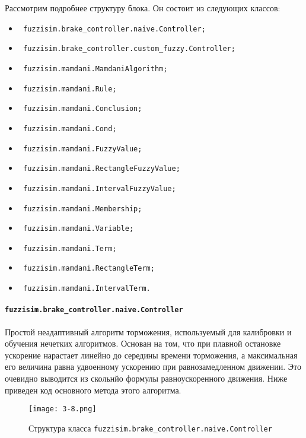 Рассмотрим подробнее структуру блока. Он состоит из следующих классов:

\begin{itemize}
	\item \lstinline! fuzzisim.brake_controller.naive.Controller;!
	\item \lstinline! fuzzisim.brake_controller.custom_fuzzy.Controller;!
	\item \lstinline! fuzzisim.mamdani.MamdaniAlgorithm;!
	\item \lstinline! fuzzisim.mamdani.Rule;!
	\item \lstinline! fuzzisim.mamdani.Conclusion;!
	\item \lstinline! fuzzisim.mamdani.Cond;!
	\item \lstinline! fuzzisim.mamdani.FuzzyValue;!
	\item \lstinline! fuzzisim.mamdani.RectangleFuzzyValue;!
	\item \lstinline! fuzzisim.mamdani.IntervalFuzzyValue;!
	\item \lstinline! fuzzisim.mamdani.Membership;!
	\item \lstinline! fuzzisim.mamdani.Variable;!
	\item \lstinline! fuzzisim.mamdani.Term;!
	\item \lstinline! fuzzisim.mamdani.RectangleTerm;!
	\item \lstinline! fuzzisim.mamdani.IntervalTerm.!
\end{itemize}



\paragraph{\lstinline!fuzzisim.brake_controller.naive.Controller!}

Простой неадаптивный алгоритм торможения, используемый для калибровки и обучения нечетких алгоритмов. Основан на том, что при плавной остановке ускорение нарастает линейно до середины времени торможения, а максимальная его величина равна удвоенному ускорению при равнозамедленном движении. Это очевидно выводится из скольнйо формулы равноускоренного движения. Ниже приведен код основного метода этого алгоритма.


\begin{figure}[ht]
	\centering
	\texttt{[image: 3-8.png]}
	\caption{ Структура класса \lstinline!fuzzisim.brake_controller.naive.Controller!}
\end{figure}

